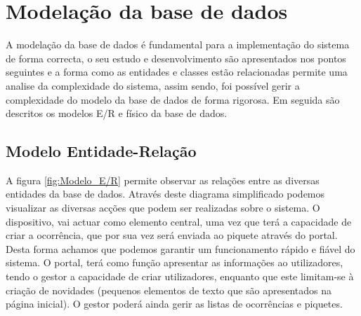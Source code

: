 %

\FloatBarrier\section{Modelação da base de dados}

A modelação da base de dados é fundamental para a implementação do sistema de forma correcta, o seu estudo e desenvolvimento são apresentados nos pontos seguintes e a forma como as entidades e classes estão relacionadas permite uma analise da complexidade do sistema, assim sendo, foi possível gerir a complexidade do modelo da base de dados de forma rigorosa. Em seguida são descritos os modelos E/R e físico da base de dados.

\FloatBarrier\subsection{Modelo Entidade-Relação}

A figura \ref{fig:Modelo_E/R} permite observar as relações entre as diversas entidades da base de dados. Através deste diagrama simplificado podemos visualizar as diversas acções que podem ser realizadas sobre o sistema.
O dispositivo, vai actuar como elemento central, uma vez que terá a capacidade de criar a ocorrência, que por sua vez será enviada ao piquete através do portal. Desta forma achamos que podemos garantir um funcionamento rápido e fiável do sistema. O portal, terá como função apresentar as informações ao utilizadores, tendo o gestor a capacidade de criar utilizadores, enquanto que este limitam-se à criação de novidades (pequenos elementos de texto que são apresentados na página inicial). O gestor poderá ainda gerir as listas de ocorrências e piquetes.

